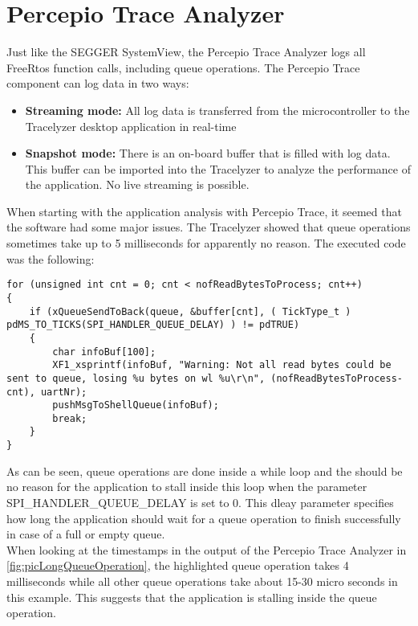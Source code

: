 \section{Percepio Trace Analyzer} \label{sec:SystemAnalysis}
Just like the SEGGER SystemView, the Percepio Trace Analyzer logs all FreeRtos function calls, including queue operations. 
The Percepio Trace component can log data in two ways:
\begin{itemize}
    \item \textbf{Streaming mode:} All log data is transferred from the microcontroller to the Tracelyzer desktop application in real-time
    \item \textbf{Snapshot mode:} There is an on-board buffer that is filled with log data. This buffer can be imported into the Tracelyzer to analyze the performance of the application. No live streaming is possible.
\end{itemize}
When starting with the application analysis with Percepio Trace, it seemed that the software had some major issues. The Tracelyzer showed that queue operations sometimes take up to 5 milliseconds for apparently no reason. The executed code was the following:
\begin{lstlisting}
for (unsigned int cnt = 0; cnt < nofReadBytesToProcess; cnt++)
{
    if (xQueueSendToBack(queue, &buffer[cnt], ( TickType_t ) pdMS_TO_TICKS(SPI_HANDLER_QUEUE_DELAY) ) != pdTRUE)
    {
        char infoBuf[100];
        XF1_xsprintf(infoBuf, "Warning: Not all read bytes could be sent to queue, losing %u bytes on wl %u\r\n", (nofReadBytesToProcess-cnt), uartNr);
        pushMsgToShellQueue(infoBuf);
        break;
    }
}
\end{lstlisting}
%
As can be seen, queue operations are done inside a while loop and the should be no reason for the application to stall inside this loop when the parameter SPI\_HANDLER\_QUEUE\_DELAY is set to 0. This dleay parameter specifies how long the application should wait for a queue operation to finish successfully in case of a full or empty queue.\\
When looking at the timestamps in the output of the Percepio Trace Analyzer in \autoref{fig:picLongQueueOperation}, the highlighted queue operation takes 4 milliseconds while all other queue operations take about 15-30 micro seconds in this example. This suggests that the application is stalling inside the queue operation.\\
